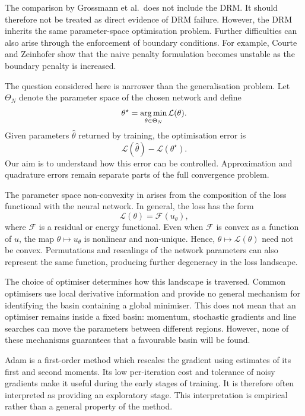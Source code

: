 \documentclass[11pt, onecolumn]{report}
\begin{document}
The comparison by Grossmann et al.\ does not include the DRM. It should therefore not be treated as direct evidence of DRM failure. However, the DRM inherits the same parameter-space optimisation problem. Further difficulties can also arise through the enforcement of boundary conditions. For example, Courte and Zeinhofer \cite{CourteZeinhofer_RobinPretraining} show that the naive penalty formulation becomes unstable as the boundary penalty is increased.

The question considered here is narrower than the generalisation problem. Let $\Theta_N$ denote the parameter space of the chosen network and define
\begin{equation*}
    \theta^\star = \operatorname*{arg\,min}_{\theta\in\Theta_N} \mathcal{L}(\theta).
\end{equation*}
Given parameters $\widehat{\theta}$ returned by training, the optimisation error is
\begin{equation*}
    \mathcal{L}(\widehat{\theta})-\mathcal{L}(\theta^\star).
\end{equation*}
Our aim is to understand how this error can be controlled. Approximation and quadrature errors remain separate parts of the full convergence problem.

The parameter space non-convexity in arises from the composition of the loss functional with the neural network. In general, the loss has the form
\begin{equation*}
    \mathcal{L}(\theta)=\mathcal{F}(u_\theta),
\end{equation*}
where $\mathcal{F}$ is a residual or energy functional. Even when $\mathcal{F}$ is convex as a function of $u$, the map $\theta\mapsto u_\theta$ is nonlinear and non-unique. Hence, $\theta\mapsto\mathcal{L}(\theta)$ need not be convex. Permutations and rescalings of the network parameters can also represent the same function, producing further degeneracy in the loss landscape.

The choice of optimiser determines how this landscape is traversed. Common optimisers use local derivative information and provide no general mechanism for identifying the basin containing a global minimiser. This does not mean that an optimiser remains inside a fixed basin: momentum, stochastic gradients and line searches can move the parameters between different regions. However, none of these mechanisms guarantees that a favourable basin will be found.

Adam \cite{KingmaBa_Adam} is a first-order method which rescales the gradient using estimates of its first and second moments. Its low per-iteration cost and tolerance of noisy gradients make it useful during the early stages of training. It is therefore often interpreted as providing an exploratory stage. This interpretation is empirical rather than a general property of the method.
\end{document}
